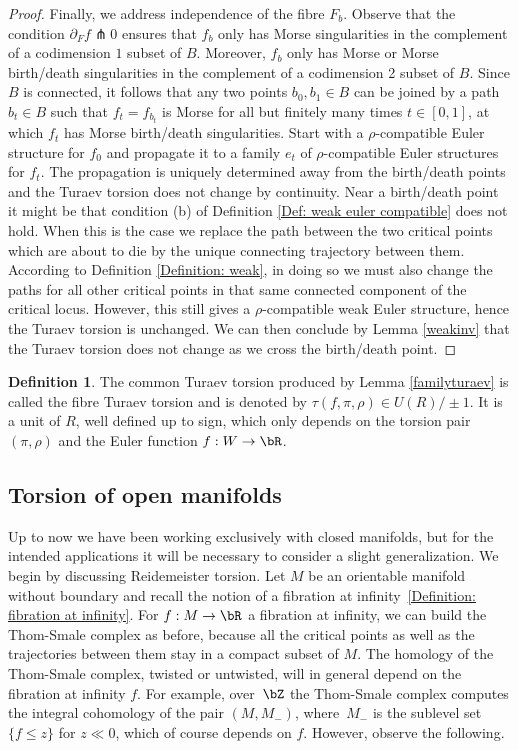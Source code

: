 \documentclass[JEP,XML,SOM,Unicode,NoFloatCountersInSection]{cedram}
\theoremstyle{plain}
\theoremstyle{definition}
\newtheorem{definition}[theorem]{Definition}
\begin{document}
\begin{proof}
Finally, we address independence of the fibre $F_b$. Observe that the condition \hbox{$\partial_F f \pitchfork 0$} ensures that $f_b$ only has Morse singularities in the complement of a codimension $1$ subset of $B$. Moreover, $f_b$ only has Morse or Morse birth/death singularities in the complement of a codimension 2 subset of $B$. Since $B$ is connected, it follows that any two points $b_0, b_1 \in B$ can be joined by a path $b_t \in B$ such that $f_t=f_{b_t}$ is Morse for all but finitely many times $t\in [0,1]$, at which $f_t$ has Morse birth/death singularities. Start with a $\rho$-compatible Euler structure for $f_0$ and propagate it to a family $e_t$ of $\rho$-compatible Euler structures for $f_t$. The propagation is uniquely determined away from the birth/death points and the Turaev torsion does not change by continuity. Near a birth/death point it might be that condition (b) of Definition \ref{Def: weak euler compatible} does not hold. When this is the case we replace the path between the two critical points which are about to die by the unique connecting trajectory between them. According to Definition \ref{Definition: weak}, in doing so we must also change the paths for all other critical points in that same connected component of the critical locus. However, this still gives a $\rho$-compatible weak Euler structure, hence the Turaev torsion is unchanged. We can then conclude by Lemma \ref{weakinv} that the Turaev torsion does not change as we cross the birth/death point. \end{proof}

\begin{definition}
The common Turaev torsion produced by Lemma \ref{familyturaev} is called the fibre Turaev torsion and is denoted by $\tau(f,\pi, \rho) \in U(R) / \pm 1$. It is a unit of $R$, well defined up to sign, which only depends on the torsion pair $(\pi, \rho)$ and the Euler function $f:W \to \bR$.
\end{definition}

\subsection{Torsion of open manifolds}

Up to now we have been working exclusively with closed manifolds, but for the intended applications it will be necessary to consider a slight generalization. We begin by discussing Reidemeister torsion. Let $M$ be an orientable manifold without boundary and recall the notion of a fibration at infinity~\ref{Definition: fibration at infinity}. For $f:M \to \bR$ a fibration at infinity, we can build the Thom-Smale complex as before, because all the critical points as well as the trajectories between them stay in a compact subset of $M$. The homology of the Thom-Smale complex, twisted or untwisted, will in general depend on the fibration at infinity $f$. For example, over~$\bZ$ the Thom-Smale complex computes the integral cohomology of the pair $(M,M_{-})$, where~$M_{-}$ is the sublevel set $\{ f \leq z \}$ for $z\ll0$, which of course depends on $f$. However, observe the following.
\end{document}
